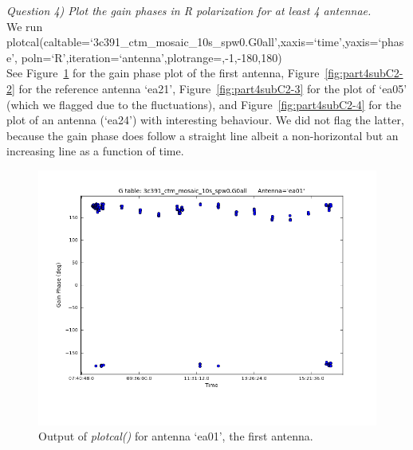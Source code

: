 \documentclass[12pt, a4paper]{article}
\begin{document}
\noindent \textit{Question 4) Plot the gain phases in R polarization for at least 4 antennae.} \\
We run {\tiny plotcal(caltable=`3c391\_ctm\_mosaic\_10s\_spw0.G0all',xaxis=`time',yaxis=`phase', poln=`R',iteration=`antenna',plotrange=,-1,-180,180\rbrack) }  \\
See Figure~\ref{fig:part4subC2-1} for the gain phase plot of the first antenna, Figure~\ref{fig:part4subC2-2} for the reference antenna `ea21', Figure~\ref{fig:part4subC2-3} for the plot of `ea05' (which we flagged due to the fluctuations), and Figure~\ref{fig:part4subC2-4} for the plot of an antenna (`ea24') with interesting behaviour. We did not flag the latter, because the gain phase does follow a straight line albeit a non-horizontal but an increasing line as a function of time. 

\newpage 

\begin{figure}[h!]
    \centering
    \includegraphics[scale=0.5]{../Imaging/plots/phase_calibration_part4c_question5_ea01.png}
    \caption{Output of \emph{plotcal()} for antenna `ea01', the first antenna. \label{fig:part4subC2-1}}
\end{figure}
\end{document}
